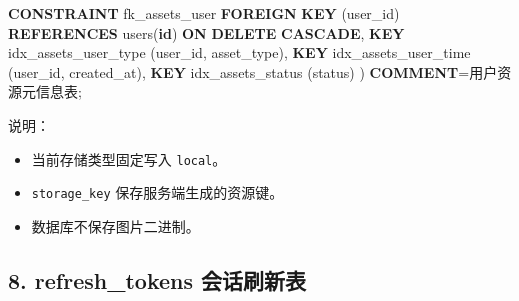 \documentclass[
  a4paper,
  UTF8]{ctexart}
\newenvironment{Shaded}{}{}
\newcommand{\KeywordTok}[1]{\textcolor[rgb]{0.00,0.44,0.13}{\textbf{#1}}}
\newcommand{\NormalTok}[1]{#1}
\newcommand{\OperatorTok}[1]{\textcolor[rgb]{0.40,0.40,0.40}{#1}}
\newcommand{\StringTok}[1]{\textcolor[rgb]{0.25,0.44,0.63}{#1}}
\providecommand{\tightlist}{%
  \setlength{\itemsep}{0pt}\setlength{\parskip}{0pt}}
\begin{document}
\begin{Shaded}
\begin{Highlighting}[]
  \KeywordTok{CONSTRAINT}\NormalTok{ fk\_assets\_user}
    \KeywordTok{FOREIGN} \KeywordTok{KEY}\NormalTok{ (user\_id) }\KeywordTok{REFERENCES}\NormalTok{ users(}\KeywordTok{id}\NormalTok{)}
    \KeywordTok{ON} \KeywordTok{DELETE} \KeywordTok{CASCADE}\NormalTok{,}
  \KeywordTok{KEY}\NormalTok{ idx\_assets\_user\_type (user\_id, asset\_type),}
  \KeywordTok{KEY}\NormalTok{ idx\_assets\_user\_time (user\_id, created\_at),}
  \KeywordTok{KEY}\NormalTok{ idx\_assets\_status (status)}
\NormalTok{) }\KeywordTok{COMMENT}\OperatorTok{=}\StringTok{\textquotesingle{}用户资源元信息表\textquotesingle{}}\NormalTok{;}
\end{Highlighting}
\end{Shaded}

说明：

\begin{itemize}
\tightlist
\item
  当前存储类型固定写入 \texttt{local}。
\item
  \texttt{storage\_key} 保存服务端生成的资源键。
\item
  数据库不保存图片二进制。
\end{itemize}

\hypertarget{refresh_tokens-ux4f1aux8bddux5237ux65b0ux8868}{%
\subsection{8. refresh\_tokens
会话刷新表}\label{refresh_tokens-ux4f1aux8bddux5237ux65b0ux8868}}
\end{document}
